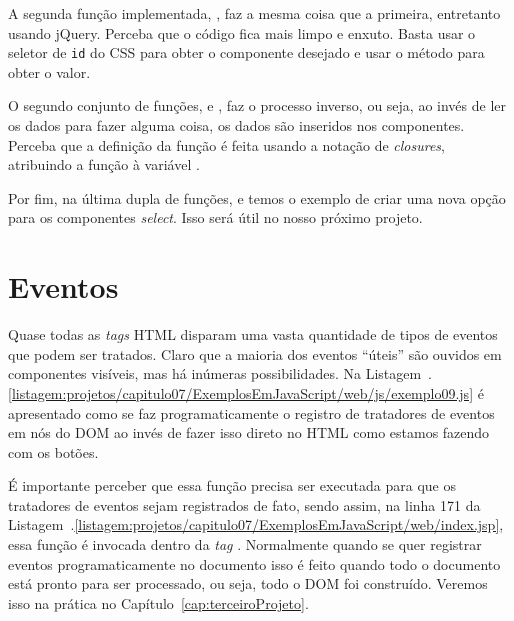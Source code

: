 A segunda função implementada, , faz a mesma coisa que a primeira, entretanto usando jQuery. Perceba que o código fica mais limpo e enxuto. Basta usar o seletor de \texttt{id} do CSS para obter o componente desejado e usar o método  para obter o valor.

O segundo conjunto de funções,  e \newline%
, faz o processo inverso, ou seja, ao invés de ler os dados para fazer alguma coisa, os dados são inseridos nos componentes. Perceba que a definição da função  é feita usando a notação de \textit{closures}, atribuindo a função à variável .

Por fim, na última dupla de funções,  e \newline%
 temos o exemplo de criar uma nova opção para os componentes \textit{select}. Isso será útil no nosso próximo projeto.



\section{Eventos}

Quase todas as \textit{tags} HTML disparam uma vasta quantidade de tipos de eventos que podem ser tratados. Claro que a maioria dos eventos ``úteis'' são ouvidos em componentes visíveis, mas há inúmeras possibilidades. Na Listagem~\thechapter.\ref{listagem:projetos/capitulo07/ExemplosEmJavaScript/web/js/exemplo09.js} é apresentado como se faz programaticamente o registro de tratadores de eventos em nós do DOM ao invés de fazer isso direto no HTML como estamos fazendo com os botões.


É importante perceber que essa função precisa ser executada para que os tratadores de eventos sejam registrados de fato, sendo assim, na linha 171 da Listagem~\thechapter.\ref{listagem:projetos/capitulo07/ExemplosEmJavaScript/web/index.jsp}, essa função é invocada dentro da \textit{tag} . Normalmente quando se quer registrar eventos programaticamente no documento isso é feito quando todo o documento está pronto para ser processado, ou seja, todo o DOM foi construído. Veremos isso na prática no Capítulo~\ref{cap:terceiroProjeto}.

